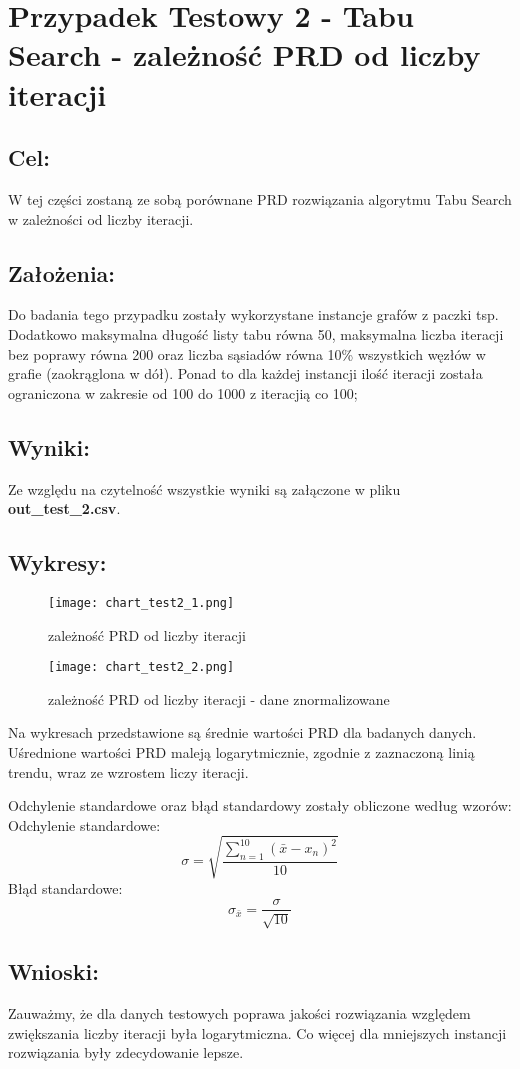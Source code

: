 \section{Przypadek Testowy 2 - Tabu Search - zależność PRD od liczby iteracji}
  \subsection{Cel:}
    W tej części zostaną ze sobą porównane PRD rozwiązania algorytmu Tabu Search w zależności od liczby iteracji.
    \subsection{Założenia:}
    Do badania tego przypadku zostały wykorzystane instancje grafów z paczki tsp. Dodatkowo maksymalna długość listy tabu równa 50, maksymalna liczba iteracji bez poprawy równa 200 oraz liczba sąsiadów równa 10\% wszystkich węzłów w grafie (zaokrąglona w dół). Ponad to dla każdej instancji ilość iteracji została ograniczona w zakresie od 100 do 1000 z iteracjią co 100;
  \subsection{Wyniki: }
    Ze względu na czytelność wszystkie wyniki są załączone w pliku \textbf{out\_test\_2.csv}.
  \subsection{Wykresy: }
    \begin{figure}[H]
      \texttt{[image: chart\_test2\_1.png]}
      \centering
      \caption{zależność PRD od liczby iteracji}
    \end{figure}
    \begin{figure}[H]
      \texttt{[image: chart\_test2\_2.png]}
      \centering
      \caption{zależność PRD od liczby iteracji - dane znormalizowane}
    \end{figure}

    Na wykresach przedstawione są średnie wartości PRD dla badanych danych. Uśrednione wartości PRD maleją logarytmicznie, zgodnie z zaznaczoną linią trendu, wraz ze wzrostem liczy iteracji.

    Odchylenie standardowe oraz błąd standardowy zostały obliczone według wzorów: \\
    Odchylenie standardowe:
    \[ \sigma = \sqrt{\frac{\sum_{n = 1}^{10}(\bar{x} - x_n)^2}{10}} \]
    Błąd standardowe:
    \[ \sigma_{\bar{x}} = \frac{\sigma}{\sqrt{10}} \]

  \subsection{Wnioski: }
    Zauważmy, że dla danych testowych poprawa jakości rozwiązania względem zwiększania liczby iteracji była logarytmiczna. Co więcej dla mniejszych instancji rozwiązania były zdecydowanie lepsze.

